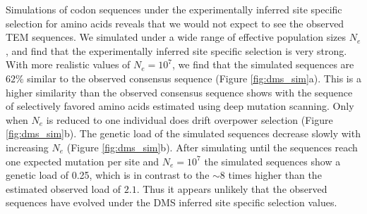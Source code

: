 \documentclass[12pt]{article}
\begin{document}
Simulations of codon sequences under the experimentally inferred site specific selection for amino acids reveals that we would not expect to see the observed TEM sequences.
We simulated under a wide range of effective population sizes $N_e$, and find that the experimentally inferred site specific selection is very strong.
With more realistic values of $N_e = 10^7$, we find that the simulated sequences are $62 \%$ similar to the observed consensus sequence (Figure \ref{fig:dms_sim}a).
This is a higher similarity than the observed consensus sequence shows with the sequence of selectively favored amino acids estimated using deep mutation scanning.
Only when $N_e$ is reduced to one individual does drift overpower selection (Figure \ref{fig:dms_sim}b).
The genetic load of the simulated sequences decrease slowly with increasing $N_e$ (Figure \ref{fig:dms_sim}b).
After simulating until the sequences reach one expected mutation per site and $N_e = 10^7$ the simulated sequences show a genetic load of 0.25, which is in contrast to the $\sim 8$ times higher than the estimated observed load of $2.1$.
Thus it appears unlikely that the observed sequences have evolved under the DMS inferred site specific selection values.
\end{document}
